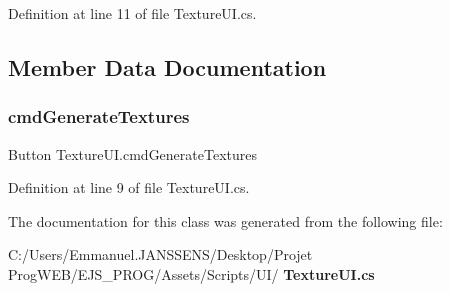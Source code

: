 Definition at line 11 of file Texture\+U\+I.\+cs.



\subsection{Member Data Documentation}
\mbox{\label{class_texture_u_i_ac59dd7e782fdc51745ab4907eb967e3e}} 
\subsubsection{cmd\+Generate\+Textures}
{\footnotesize\ttfamily Button Texture\+U\+I.\+cmd\+Generate\+Textures}



Definition at line 9 of file Texture\+U\+I.\+cs.



The documentation for this class was generated from the following file\+:\begin{DoxyCompactItemize}
\item 
C\+:/\+Users/\+Emmanuel.\+J\+A\+N\+S\+S\+E\+N\+S/\+Desktop/\+Projet Prog\+W\+E\+B/\+E\+J\+S\+\_\+\+P\+R\+O\+G/\+Assets/\+Scripts/\+U\+I/\textbf{ Texture\+U\+I.\+cs}\end{DoxyCompactItemize}
